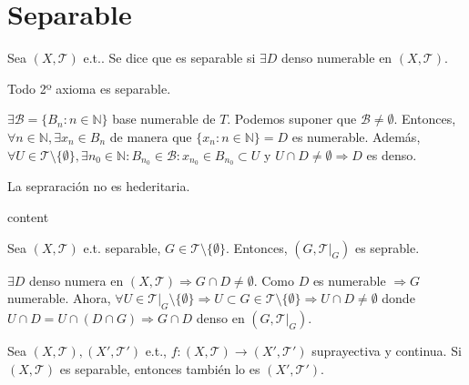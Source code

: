 \section{Separable}

\begin{defn}[Separable]
  Sea $( X, \mathcal{T} )$ e.t.. Se dice que es separable si $\exists D$ denso numerable en $( X, \mathcal{T} )$.
\end{defn}

\begin{prop}
  Todo 2º axioma es separable.
\end{prop}

\begin{dem}
  $\exists \mathcal{B} = \{  B_{n} : n \in \mathbb{N} \}$ base numerable de $T$. Podemos suponer que $\mathcal{B} \neq \emptyset$. Entonces, $\forall n \in \mathbb{N}, \exists x_{n} \in B_{n}$ de manera que $\{ x_{n} : n \in \mathbb{N} \} = D$ es numerable. Además, $\forall U \in \mathcal{T} \setminus \{ \emptyset \}, \exists n_{0} \in \mathbb{N} : B_{n_{0}} \in \mathcal{B} : x_{n_{0}} \in B_{n_{0}}\subset U$ y $U \cap D \neq \emptyset \Rightarrow D$ es denso.
\end{dem}

\begin{obs}
  La sepraración no es hederitaria.
\end{obs}

\begin{dem}
  content
\end{dem}

\begin{prop}
  Sea $( X, \mathcal{T} )$ e.t. separable, $G \in \mathcal{T} \mathcal{ \setminus \{  \emptyset \}}$. Entonces, $( G, \mathcal{T}|_{G})$ es seprable.
\end{prop}

\begin{dem}
  $\exists D$ denso numera en $( X, \mathcal{T} ) \Rightarrow G \cap D \neq \emptyset$. Como $D$ es numerable $\Rightarrow G$ numerable. Ahora, $\forall U \in \mathcal{T}|_{G} \setminus \{  \emptyset \} \Rightarrow U \subset G \in \mathcal{T} \setminus \{  \emptyset \} \Rightarrow U \cap D \neq \emptyset$ donde $ U \cap D = U \cap (D \cap G) \Rightarrow G \cap D$ denso en $( G, \mathcal{T}|_{G})$.
\end{dem}

\begin{prop}
  Sea $( X, \mathcal{T} ), ( X', \mathcal{T}' )$ e.t., $f: ( X, \mathcal{T} ) \to ( X', \mathcal{T}' )$ suprayectiva y continua. Si $( X, \mathcal{T} )$ es separable, entonces también lo es $( X', \mathcal{T}' )$.
\end{prop}

